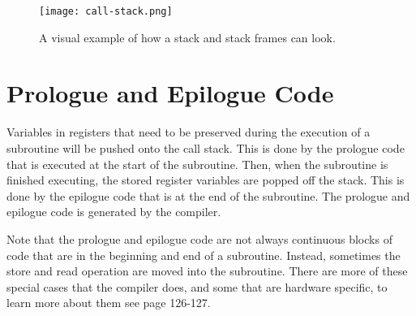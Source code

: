 \begin{figure}[h]
	\centering
	\texttt{[image: call-stack.png]}
	\caption{A visual example of how a stack and stack frames can look.}
	\label{fig:callstack}
\end{figure}





\section{Prologue and Epilogue Code}
 


Variables in registers that need to be preserved during the execution of a subroutine will be pushed onto the call stack.
This is done by the prologue code that is executed at the start of the subroutine.
Then, when the subroutine is finished executing, the stored register variables are popped off the stack.
This is done by the epilogue code that is at the end of the subroutine.
The prologue and epilogue code is generated by the compiler.


Note that the prologue and epilogue code are not always continuous blocks of code that are in the beginning and end of a subroutine.
Instead, sometimes the store and read operation are moved into the subroutine.
There are more of these special cases that the compiler does, and some that are hardware specific, to learn more about them see \cite{dwarf} page 126-127.



